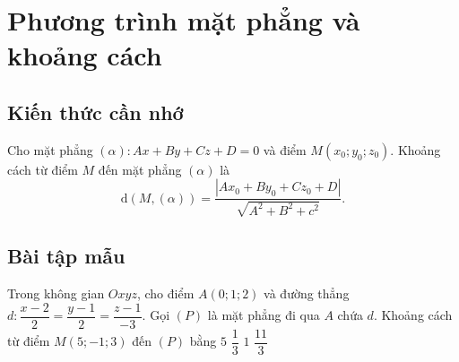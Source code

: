 \setcounter{section}{45}
\setcounter{ex}{0}
\section{Phương trình mặt phẳng và khoảng cách}
\subsection{Kiến thức cần nhớ}
\begin{khung}
	Cho mặt phẳng $(\alpha)\colon Ax+By+Cz+D=0$ và điểm $M\left(x_0;y_0;z_0\right)$. Khoảng cách từ điểm $M$ đến mặt phẳng $(\alpha)$ là $$\mathrm{d}(M,(\alpha))=\dfrac{\left|Ax_0+By_0+Cz_0+D\right|}{\sqrt{A^2+B^2+c^2}}.$$
\end{khung}
\subsection{Bài tập mẫu}
\begin{khung}
\begin{vd}%
	Trong không gian $Oxyz$, cho điểm $A(0;1;2)$ và đường thẳng $d\colon\dfrac{x-2}{2}=\dfrac{y-1}{2}=\dfrac{z-1}{-3}$. Gọi $(P)$ là mặt phẳng đi qua $A$ chứa $d$. Khoảng cách từ điểm $M(5;-1;3)$ đến $(P)$ bằng 
	\choice
	{$5$}
	{$\dfrac{1}{3}$}
	{\True $1$}
	{$\dfrac{11}{3}$}
\end{vd}
\end{khung}

